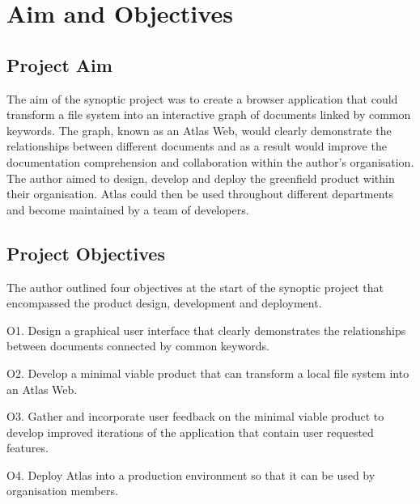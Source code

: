 \documentclass{article}
\begin{document}
\section{Aim and Objectives}

\subsection{Project Aim}

The aim of the synoptic project was to create a browser application that could transform a file system into an interactive graph of documents linked by common keywords. The graph, known as an Atlas Web, would clearly demonstrate the relationships between different documents and as a result would improve the documentation comprehension and collaboration within the author's organisation. The author aimed to design, develop and deploy the greenfield product within their organisation. Atlas could then be used throughout different departments and become maintained by a team of developers.

\subsection{Project Objectives}

The author outlined four objectives at the start of the synoptic project that encompassed the product design, development and deployment.

O1. Design a graphical user interface that clearly demonstrates the relationships between documents connected by common keywords.

O2. Develop a minimal viable product that can transform a local file system into an Atlas Web.

O3. Gather and incorporate user feedback on the minimal viable product to develop improved iterations of the application that contain user requested features.

O4. Deploy Atlas into a production environment so that it can be used by organisation members. 

\newpage
\end{document}
